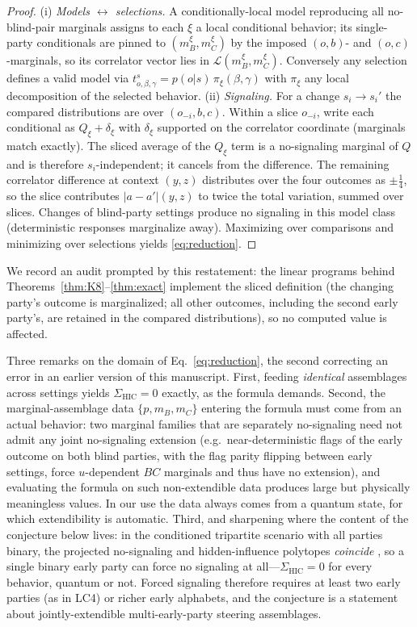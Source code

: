 \documentclass[10pt,twocolumn]{article}
\newcommand{\Sig}{\Sigma_{\mathrm{HIC}}}
\begin{document}
\begin{proof}
(i) \emph{Models $\leftrightarrow$ selections.} A conditionally-local model reproducing all no-blind-pair marginals assigns to each $\xi$ a local conditional behavior; its single-party conditionals are pinned to $(m_B^\xi,m_C^\xi)$ by the imposed $(o,b)$- and $(o,c)$-marginals, so its correlator vector lies in $\mathcal L(m_B^\xi,m_C^\xi)$. Conversely any selection defines a valid model via $t^{s}_{o,\beta,\gamma} = p(o|s)\,\pi_\xi(\beta,\gamma)$ with $\pi_\xi$ any local decomposition of the selected behavior. (ii) \emph{Signaling.} For a change $s_i\to s_i'$ the compared distributions are over $(o_{-i},b,c)$. Within a slice $o_{-i}$, write each conditional as $Q_\xi + \delta_\xi$ with $\delta_\xi$ supported on the correlator coordinate (marginals match exactly). The sliced average of the $Q_\xi$ term is a no-signaling marginal of $Q$ and is therefore $s_i$-independent; it cancels from the difference. The remaining correlator difference at context $(y,z)$ distributes over the four outcomes as $\pm\tfrac14$, so the slice contributes $|a-a'|(y,z)$ to twice the total variation, summed over slices. Changes of blind-party settings produce no signaling in this model class (deterministic responses marginalize away). Maximizing over comparisons and minimizing over selections yields \eqref{eq:reduction}.
\end{proof}

We record an audit prompted by this restatement: the linear programs behind Theorems~\ref{thm:K8}--\ref{thm:exact} implement the sliced definition (the changing party's outcome is marginalized; all other outcomes, including the second early party's, are retained in the compared distributions), so no computed value is affected.

Three remarks on the domain of Eq.~\eqref{eq:reduction}, the second correcting an error in an earlier version of this manuscript. First, feeding \emph{identical} assemblages across settings yields $\Sig=0$ exactly, as the formula demands. Second, the marginal-assemblage data $\{p, m_B, m_C\}$ entering the formula must come from an actual behavior: two marginal families that are separately no-signaling need not admit any joint no-signaling extension (e.g.\ near-deterministic flags of the early outcome on both blind parties, with the flag parity flipping between early settings, force $u$-dependent $BC$ marginals and thus have no extension), and evaluating the formula on such non-extendible data produces large but physically meaningless values. In our use the data always comes from a quantum state, for which extendibility is automatic. Third, and sharpening where the content of the conjecture below lives: in the conditioned tripartite scenario with all parties binary, the projected no-signaling and hidden-influence polytopes \emph{coincide} \cite{Barnea2013}, so a single binary early party can force no signaling at all---$\Sig=0$ for every behavior, quantum or not. Forced signaling therefore requires at least two early parties (as in LC4) or richer early alphabets, and the conjecture is a statement about jointly-extendible multi-early-party steering assemblages.
\end{document}
